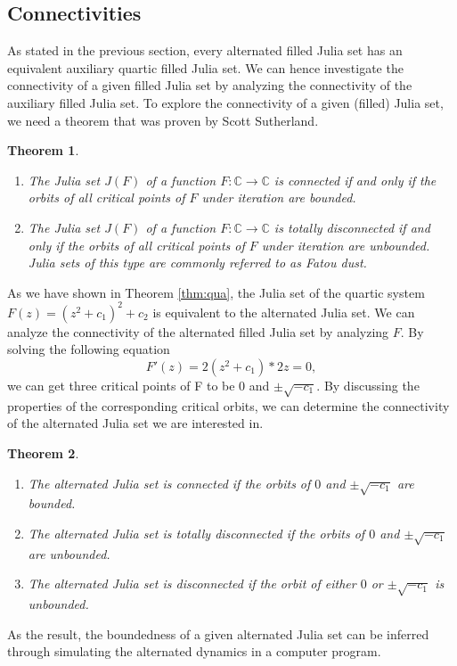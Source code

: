 \documentclass{amsart}
\theoremstyle{plain}
\newtheorem{theorem}{Theorem}[section]
\theoremstyle{definition}
\theoremstyle{remark}
\numberwithin{equation}{section}
\newcommand{\C}{\mathbb{C}}
\begin{document}
  \subsection{Connectivities} 
  As stated in the previous section, every alternated filled Julia set has an equivalent auxiliary quartic filled Julia set. We can hence investigate the connectivity of a given filled Julia set by analyzing the connectivity of the auxiliary filled Julia set. To explore the connectivity of a given (filled) Julia set, we need a theorem that was proven by Scott Sutherland. 
  \begin{theorem}\cite[Section 6]{sutherland2014}
  \label{thm:connectivity}
\begin{enumerate}
\item The Julia set $J(F)$ of a function $F:\C\rightarrow\C$ is connected if and only if the orbits of all critical points of $F$ under iteration are bounded.
\item The Julia set $J(F)$ of a function 
$F:\C\rightarrow\C$ is totally disconnected if and only if the orbits of all critical points of 
$F$ under iteration are unbounded. Julia sets of this type are commonly referred to as Fatou dust.
\end{enumerate}
  \end{theorem}
  As we have shown in Theorem \ref{thm:qua}, the Julia set of the quartic system $F(z) = (z^2+c_1)^2+c_2$ is equivalent to the alternated Julia set. We can analyze the connectivity of the alternated filled Julia set by analyzing $F$. By solving the following equation 
  \[
  F'(z) = 2(z^2+c_1)*2z = 0,
  \]
  we can get three critical points of F to be $0$ and $\pm\sqrt{-c_1}$. By discussing the properties of the corresponding critical orbits, we can determine the connectivity of the alternated Julia set we are interested in.
  \begin{theorem} \cite[Section 3.1]{MR2567586}
      \begin{enumerate}
          \item The alternated Julia set is connected if the orbits of $0$ and $\pm\sqrt{-c_1}$ are bounded.
          \item 
          The alternated Julia set is totally disconnected if the orbits of $0$ and $\pm\sqrt{-c_1}$ are unbounded.
          \item The alternated Julia set is disconnected if the orbit of either $0$ or $\pm\sqrt{-c_1}$ is unbounded.
      \end{enumerate}
  \end{theorem}
  As the result, the boundedness of a given alternated Julia set can be inferred through simulating the alternated dynamics in a computer program. 
\end{document}
